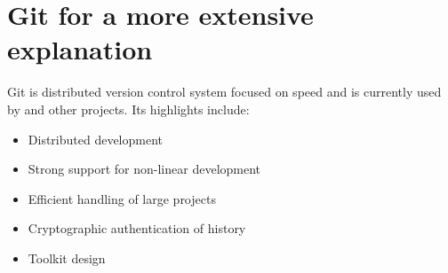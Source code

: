 
\section[Git]{Git for a more extensive explanation\cite{website:git}}\label{sec:Git}

Git is distributed version control system focused on speed and is currently used by \GNOME and other projects. Its highlights include:

\begin{itemize}
  \item Distributed development
  \item Strong support for non-linear development
  \item Efficient handling of large projects
  \item Cryptographic authentication of history
  \item Toolkit design
\end{itemize}

